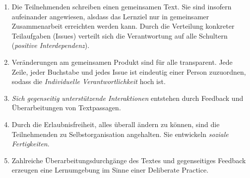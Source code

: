 \documentclass
	[
		11pt,
		a4paper,
		oneside,
		ngerman
	]
	{article}
\begin{document}
\begin{enumerate}

	\item Die Teilnehmenden schreiben einen gemeinsamen Text.
	Sie sind insofern aufeinander angewiesen, alsdass das Lernziel nur in gemeinsamer Zusammenarbeit erreichten werden kann.
	Durch die Verteilung konkreter Teilaufgaben (Issues) verteilt sich die Verantwortung auf alle Schultern (\emph{positive Interdependenz}).
	\item Veränderungen am gemeinsamen Produkt sind für alle transparent.
	Jede Zeile, jeder Buchstabe und jedes Issue ist eindeutig einer Person zuzuordnen, sodass die \emph{Individuelle Verantwortlichkeit} hoch ist.
	\item \emph{Sich gegenseitig unterstützende Interaktionen} entstehen durch Feedback und Überarbeitungen von Textpassagen.
	\item Durch die Erlaubnisfreiheit, alles überall ändern zu können, sind die Teilnehmenden zu Selbstorganisation angehalten.
	Sie entwickeln \emph{soziale Fertigkeiten}.
	\citep[vgl.][]{johnson-1999}
	\item Zahlreiche Überarbeitungsdurchgänge des Textes und gegenseitiges Feedback erzeugen eine Lernumgebung im Sinne einer Deliberate Practice.

\end{enumerate}






\end{document}
